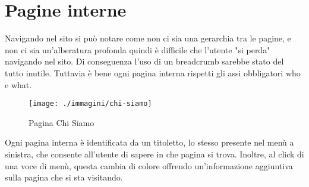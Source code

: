 \chapter{Pagine interne}
\label{cap:pagine-interne}
Navigando nel sito si può notare come non ci sia una gerarchia tra le pagine, e non ci sia un'alberatura profonda quindi è difficile che l'utente "si perda" navigando nel sito. Di conseguenza l'uso di un breadcrumb sarebbe stato del tutto inutile. Tuttavia è bene ogni pagina interna rispetti gli assi obbligatori who e what.
\begin{figure}[ht]
    \centering
    \texttt{[image: ./immagini/chi-siamo]}
    \caption [Pagina Chi Siamo]{Pagina Chi Siamo}
\end{figure}

Ogni pagina interna è identificata da un titoletto, lo stesso presente nel menù a sinistra, che consente all'utente di sapere in che pagina si trova. Inoltre, al click di una voce di menù, questa cambia di colore offrendo un'informazione aggiuntiva sulla pagina che si sta visitando.